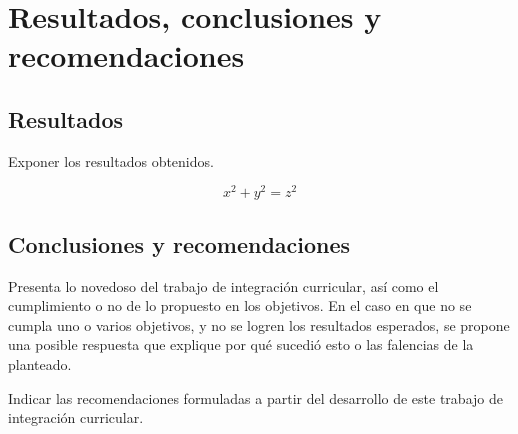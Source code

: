 \chapter{Resultados, conclusiones y recomendaciones}

\section{Resultados}

Exponer los resultados obtenidos.

\begin{equation}
    x^2+y^2=z^2
\end{equation}

\section{Conclusiones y recomendaciones}

Presenta lo novedoso del trabajo de integración curricular, así como el cumplimiento o no de lo propuesto en los objetivos. En el caso en que no se cumpla uno o varios objetivos, y no se logren los resultados esperados, se propone una posible respuesta que explique por qué sucedió esto o las falencias de la planteado. 

Indicar las recomendaciones formuladas a partir del desarrollo de este trabajo de integración curricular.